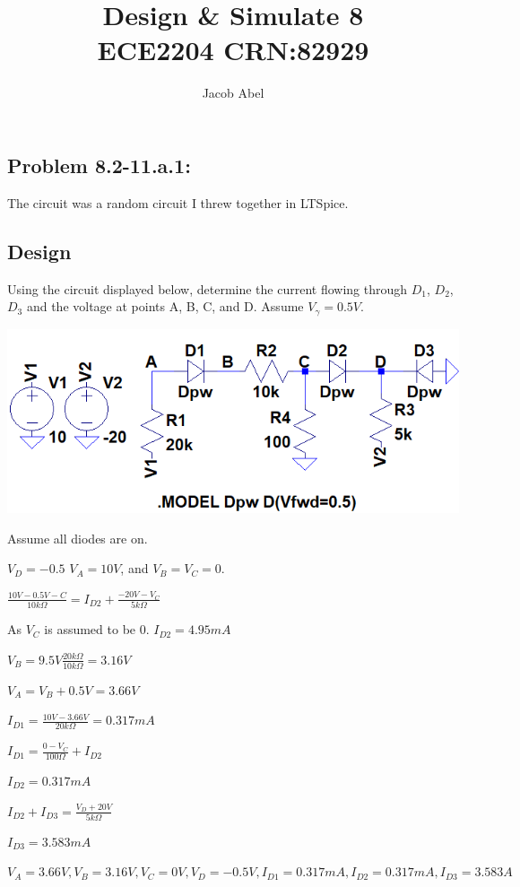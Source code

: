\documentclass[12pt,letterpaper,titlepage]{article}
\author{Jacob Abel}
\title{	Design \& Simulate 8
	\\\large ECE2204 CRN:82929
}
\begin{document}
\maketitle
\begin{raggedright}

\section{Problem 8.2-11.a.1: } The circuit was a random circuit I threw together in LTSpice.
\subsection{Design}
Using the circuit displayed below, determine the current flowing through $D_1$, $D_2$, $D_3$ and the voltage at points A, B, C, and D. Assume $V_\gamma = 0.5V$.

\begin{center}
\includegraphics[width=\textwidth, height=9\baselineskip, keepaspectratio=true]{ds1}
\end{center}

Assume all diodes are on.

$V_D = -0.5$ $V_A = 10V$, and $V_B = V_C = 0$.

$\frac{10V-0.5V-C}{10k\Omega} = I_{D2} + \frac{-20V - V_C}{5k\Omega}$

As $V_C$ is assumed to be 0. $I_{D2} = 4.95mA$

$V_B = 9.5V\frac{20k\Omega}{10k\Omega} = 3.16V$

$V_A = V_B + 0.5V = 3.66V$

$I_{D1} = \frac{10V-3.66V}{20k\Omega} = 0.317mA$

$I_{D1} = \frac{0-V_C}{100\Omega} + I_{D2}$

$I_{D2} = 0.317mA$

$I_{D2} + I_{D3} = \frac{V_D + 20V}{5k\Omega}$

$I_{D3} = 3.583mA$

$V_A = 3.66V, V_B = 3.16V, V_C = 0V, V_D = -0.5V, I_{D1} = 0.317mA, I_{D2} = 0.317mA, I_{D3} = 3.583A$


\end{raggedright}
\end{document}
